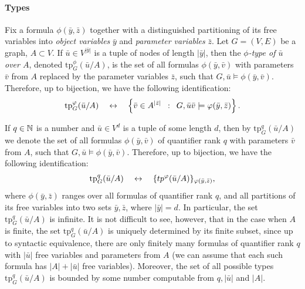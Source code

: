 \paragraph{Types}
\newcommand{\tp}{\mathrm{tp}}
Fix a formula $\phi(\bar y,\bar z)$ together with a distinguished partitioning of its free variables into 
\emph{object variables} $\bar y$ and \emph{parameter variables} $\bar z$. 
Let $G=(V,E)$ be a graph, $A\subset V$.
If $\bar u\in V^{|\bar y|}$ is a tuple of 
nodes of length $|\bar y|$, then the 
\emph{$\phi$-type of $\bar u$ over $A$},
denoted $\tp^\phi_G(\bar u/A)$,
is the set of all
formulas  $\phi(\bar y,\bar v)$ 
with parameters $\bar v$ from $A$
replaced by the parameter variables $\bar z$,
such that $G,\bar u\models \phi(\bar y,\bar v)$.
Therefore, up to  bijection, we have the following identification:
$$\tp^\phi_G(\bar u/A)\quad\leftrightarrow\quad\setof{\bar v\in  A^{|\bar z|}}{G, \bar u\bar v\models \phi(\bar y,\bar z)}.$$


If $q\in \mathbb{N}$ is a number and $\bar u\in  V^{d}$
is a tuple of some length $d$, then by $\tp^q_G(\bar u/A)$  we denote the set of all formulas $\phi(\bar y,\bar v)$
of quantifier rank $q$ with parameters $\bar v$ from $A$,
such that $G,\bar u\models \phi(\bar y,\bar v)$.
Therefore, up to  bijection, we have the following identification:
$$\tp^q_G(\bar u/A)\quad\leftrightarrow\quad\set{tp^\phi(\bar u/A)}_{\phi(\bar y,\bar z)},$$
where $\phi(\bar y,\bar z)$ ranges over all formulas of quantifier rank $q$, and all partitions of its free variables into two sets $\bar y,\bar z$,
where $|\bar y|=d$. 
In particular, the set $\tp^q_G(\bar u/A)$ is infinite.
It is not difficult to see, however, that in the case when $A$ is finite,
the set $\tp^q_G(\bar u/A)$ is uniquely determined by its finite subset, since up to syntactic equivalence, there are only finitely many formulas of quantifier rank $q$ with $|\bar u|$ free variables and  parameters from $A$
(we can assume that each such formula has $|A|+|\bar u|$ free variables).
Moreover, the set of all possible types 
$\tp^q_G(\bar u/A)$ is bounded by some number 
 computable  from 
$q,|\bar u|$ and $|A|$.

